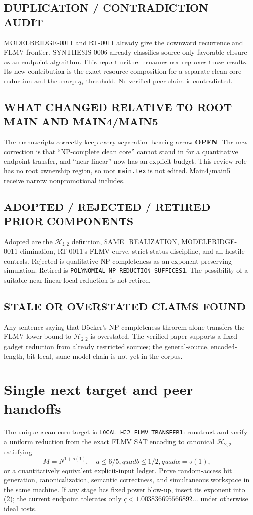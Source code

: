 \documentclass[11pt]{article}
\newcommand{\Htwo}{\mathcal H_{2,2}}
\newcommand{\OPEN}{\textbf{OPEN}}
\begin{document}
\subsection*{DUPLICATION / CONTRADICTION AUDIT}
MODELBRIDGE-0011 and RT-0011 already give the downward recurrence and FLMV
frontier.  SYNTHESIS-0006 already classifies source-only favorable closure as
an endpoint algorithm.  This report neither renames nor reproves those
results.  Its new contribution is the exact resource composition for a
separate clean-core reduction and the sharp $q_*$ threshold.  No verified
peer claim is contradicted.

\subsection*{WHAT CHANGED RELATIVE TO ROOT MAIN AND MAIN4/MAIN5}
The manuscripts correctly keep every separation-bearing arrow \OPEN.  The
new correction is that ``NP-complete clean core'' cannot stand in for a
quantitative endpoint transfer, and ``near linear'' now has an explicit
budget.  This review role has no root ownership region, so root
\texttt{main.tex} is not edited.  Main4/main5 receive narrow nonpromotional
includes.

\subsection*{ADOPTED / REJECTED / RETIRED PRIOR COMPONENTS}
Adopted are the $\Htwo$ definition, SAME\_REALIZATION, MODELBRIDGE-0011
elimination, RT-0011's FLMV curve, strict status discipline, and all hostile
controls.  Rejected is qualitative NP-completeness as an exponent-preserving
simulation.  Retired is
\texttt{POLYNOMIAL-NP-REDUCTION-SUFFICES1}.  The possibility of a suitable
near-linear local reduction is not retired.

\subsection*{STALE OR OVERSTATED CLAIMS FOUND}
Any sentence saying that D\"ocker's NP-completeness theorem alone transfers
the FLMV lower bound to $\Htwo$ is overstated.  The verified paper supports a
fixed-gadget reduction from already restricted sources; the general-source,
encoded-length, bit-local, same-model chain is not yet in the corpus.

\section{Single next target and peer handoffs}
The unique clean-core target is \texttt{LOCAL-H22-FLMV-TRANSFER1}: construct
and verify a uniform reduction from the exact FLMV SAT encoding to canonical
$\Htwo$ satisfying
\[
 M=N^{1+o(1)},\quad a\le6/5,quad b\le1/2,quad\alpha=o(1),             \tag{5}
\]
or a quantitatively equivalent explicit-input ledger.  Prove random-access
bit generation, canonicalization, semantic correctness, and simultaneous
workspace in the same machine.  If any stage has fixed power blow-up, insert
its exponent into (2); the current endpoint tolerates only
$q<1.003836695566892\ldots$ under otherwise ideal costs.
\end{document}
